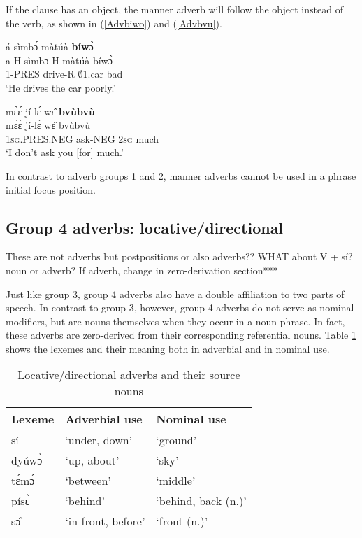 \noindent If the clause has an object, the manner adverb will follow the object instead of the verb, as shown in (\ref{Advbiwo}) and (\ref{Advbvu}).

\begin{exe} 
\ex\label{Advbiwo}
  \glll   á sìmbɔ́ màtúà {\bfseries bíwɔ̀}   \\
	a-H sìmbɔ-H màtúà bíwɔ̀ \\
              1-PRES drive-R $\emptyset$1.car bad   \\
    \trans `He drives the car poorly.'
\end{exe}

\begin{exe} 
\ex\label{Advbvu}
  \glll     mɛ̀ɛ́ jí-lɛ́ wɛ̂ {\bfseries bvùbvù} \\
	mɛ̀ɛ́ jí-lɛ́ wɛ̂ bvùbvù \\
              1\textsc{sg}.PRES.NEG ask-NEG 2\textsc{sg} much   \\
    \trans `I don't ask you [for] much.'
\end{exe}

\noindent In contrast to adverb groups 1 and 2, manner adverbs cannot be used in a phrase initial focus position.

\iffalse 
\subsection{Group 4 adverbs: locative/directional} 
\label{sec:G4ADV}

These are not adverbs but postpositions or also adverbs?? WHAT about V + sí? noun or adverb? If adverb, change in zero-derivation section***


Just like group 3, group 4 adverbs also have a double affiliation to two parts of speech. In contrast to group 3, however, group 4 adverbs do not serve as nominal modifiers, but are nouns themselves when they occur in a noun phrase. In fact, these adverbs are zero-derived from their corresponding referential nouns. Table \ref{Tab:DirAdv} shows the lexemes and their meaning both in adverbial and in nominal use. 

\begin{table} 
\centering
\begin{tabular}{lll}
Lexeme & Adverbial use & Nominal use \\  \midrule
sí & `under, down' & `ground' \\
 dyúwɔ̀ &  `up, about' & `sky' \\
tɛ́mɔ́ &  `between' & `middle' \\
písɛ̀ &   `behind' & `behind, back (n.)' \\
sɔ̂ & `in front, before' & `front (n.)' \\
\end{tabular}
\caption{Locative/directional adverbs and their source nouns}
\label{Tab:DirAdv}
\end{table}

